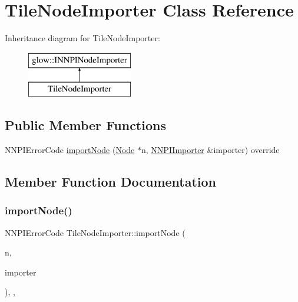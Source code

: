 \hypertarget{class_tile_node_importer}{}\section{Tile\+Node\+Importer Class Reference}
\label{class_tile_node_importer}
Inheritance diagram for Tile\+Node\+Importer\+:\begin{figure}[H]
\begin{center}
\leavevmode
\includegraphics[height=2.000000cm]{class_tile_node_importer}
\end{center}
\end{figure}
\subsection*{Public Member Functions}
\begin{DoxyCompactItemize}
\item 
N\+N\+P\+I\+Error\+Code \hyperlink{class_tile_node_importer_a9a5d996030d0e2af6a92face6b88b651}{import\+Node} (\hyperlink{classglow_1_1_node}{Node} $\ast$n, \hyperlink{classglow_1_1_n_n_p_i_importer}{N\+N\+P\+I\+Importer} \&importer) override
\end{DoxyCompactItemize}


\subsection{Member Function Documentation}
\mbox{\label{class_tile_node_importer_a9a5d996030d0e2af6a92face6b88b651}} 
\subsubsection{\texorpdfstring{import\+Node()}{importNode()}}
{\footnotesize\ttfamily N\+N\+P\+I\+Error\+Code Tile\+Node\+Importer\+::import\+Node (\begin{DoxyParamCaption}\item[{\hyperlink{classglow_1_1_node}{Node} $\ast$}]{n,  }\item[{\hyperlink{classglow_1_1_n_n_p_i_importer}{N\+N\+P\+I\+Importer} \&}]{importer }\end{DoxyParamCaption})\hspace{0.3cm}{\ttfamily [inline]}, {\ttfamily [override]}, {\ttfamily [virtual]}}

